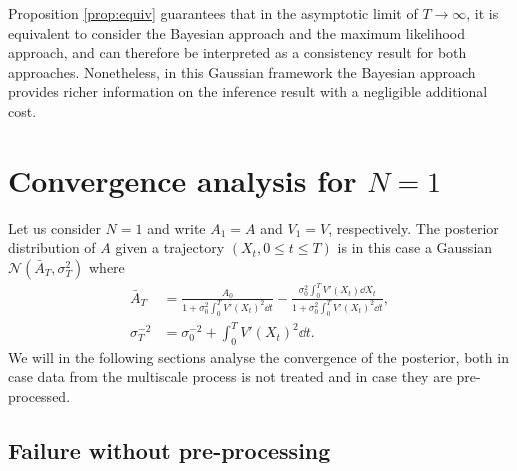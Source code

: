 \documentclass[10pt]{article}
\begin{document}
\begin{remark} Proposition \ref{prop:equiv} guarantees that in the asymptotic limit of $T \to \infty$, it is equivalent to consider the Bayesian approach and the maximum likelihood approach, and can therefore be interpreted as a consistency result for both approaches. Nonetheless, in this Gaussian framework the Bayesian approach provides richer information on the inference result with a negligible additional cost.
\end{remark}

\section{Convergence analysis for $N = 1$}

Let us consider $N = 1$ and write $A_1 = A$ and $V_1 = V$, respectively. The posterior distribution of $A$ given a trajectory $(X_t, 0 \leq t \leq T)$ is in this case a Gaussian $\mathcal N(\bar A_T, \sigma^2_T)$ where
\begin{equation}
\begin{aligned}
	\bar A_T &= \frac{A_0}{1+\sigma_0^2\int_0^T V'(X_t)^2 \dd t} - \frac{\sigma_0^2\int_0^T  V'(X_t) \dd X_t}{1+\sigma_0^2\int_0^T V'(X_t)^2 \dd t}, \\
	\sigma^{-2}_T &= \sigma_0^{-2} + \int_0^T V'(X_t)^2 \dd t.
\end{aligned}
\end{equation}
We will in the following sections analyse the convergence of the posterior, both in case data from the multiscale process is not treated and in case they are pre-processed. 

\subsection{Failure without pre-processing}
\end{document}
